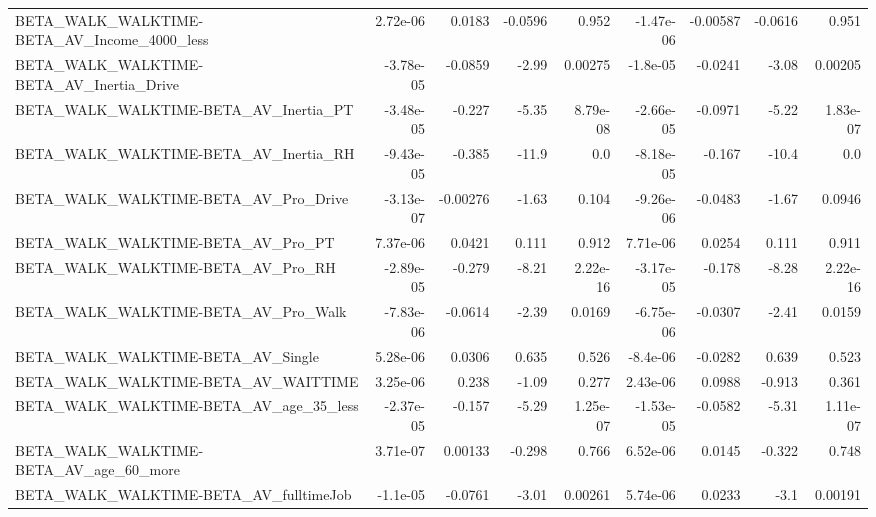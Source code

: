 \begin{tabular}{lrrrrrrrr}
BETA\_WALK\_WALKTIME-BETA\_AV\_Income\_4000\_less        &    2.72e-06 &       0.0183 &  -0.0596 &    0.952 &  -1.47e-06 &    -0.00587 &      -0.0616 &         0.951 \\
BETA\_WALK\_WALKTIME-BETA\_AV\_Inertia\_Drive           &   -3.78e-05 &      -0.0859 &    -2.99 &  0.00275 &   -1.8e-05 &     -0.0241 &        -3.08 &       0.00205 \\
BETA\_WALK\_WALKTIME-BETA\_AV\_Inertia\_PT              &   -3.48e-05 &       -0.227 &    -5.35 & 8.79e-08 &  -2.66e-05 &     -0.0971 &        -5.22 &      1.83e-07 \\
BETA\_WALK\_WALKTIME-BETA\_AV\_Inertia\_RH              &   -9.43e-05 &       -0.385 &    -11.9 &      0.0 &  -8.18e-05 &      -0.167 &        -10.4 &           0.0 \\
BETA\_WALK\_WALKTIME-BETA\_AV\_Pro\_Drive               &   -3.13e-07 &     -0.00276 &    -1.63 &    0.104 &  -9.26e-06 &     -0.0483 &        -1.67 &        0.0946 \\
BETA\_WALK\_WALKTIME-BETA\_AV\_Pro\_PT                  &    7.37e-06 &       0.0421 &    0.111 &    0.912 &   7.71e-06 &      0.0254 &        0.111 &         0.911 \\
BETA\_WALK\_WALKTIME-BETA\_AV\_Pro\_RH                  &   -2.89e-05 &       -0.279 &    -8.21 & 2.22e-16 &  -3.17e-05 &      -0.178 &        -8.28 &      2.22e-16 \\
BETA\_WALK\_WALKTIME-BETA\_AV\_Pro\_Walk                &   -7.83e-06 &      -0.0614 &    -2.39 &   0.0169 &  -6.75e-06 &     -0.0307 &        -2.41 &        0.0159 \\
BETA\_WALK\_WALKTIME-BETA\_AV\_Single                  &    5.28e-06 &       0.0306 &    0.635 &    0.526 &   -8.4e-06 &     -0.0282 &        0.639 &         0.523 \\
BETA\_WALK\_WALKTIME-BETA\_AV\_WAITTIME                &    3.25e-06 &        0.238 &    -1.09 &    0.277 &   2.43e-06 &      0.0988 &       -0.913 &         0.361 \\
BETA\_WALK\_WALKTIME-BETA\_AV\_age\_35\_less             &   -2.37e-05 &       -0.157 &    -5.29 & 1.25e-07 &  -1.53e-05 &     -0.0582 &        -5.31 &      1.11e-07 \\
BETA\_WALK\_WALKTIME-BETA\_AV\_age\_60\_more             &    3.71e-07 &      0.00133 &   -0.298 &    0.766 &   6.52e-06 &      0.0145 &       -0.322 &         0.748 \\
BETA\_WALK\_WALKTIME-BETA\_AV\_fulltimeJob             &    -1.1e-05 &      -0.0761 &    -3.01 &  0.00261 &   5.74e-06 &      0.0233 &         -3.1 &       0.00191 \\

\end{tabular}
